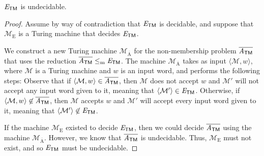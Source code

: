\begin{theorem}\label{thm:ETMundecidable}
$\mathit{E}_{\textsf{TM}}$ is undecidable.

\begin{proof}
Assume by way of contradiction that $\mathit{E}_{\textsf{TM}}$ is decidable, and suppose that $\mathcal{M}_{\mathrm{E}}$ is a Turing machine that decides $\mathit{E}_{\textsf{TM}}$.

We construct a new Turing machine $\mathcal{M}_{\overline{\mathrm{A}}}$ for the non-membership problem $\overline{\mathit{A}_{\textsf{TM}}}$ that uses the reduction $\overline{\mathit{A}_{\textsf{TM}}} \leq_{\mathrm{m}} \mathit{E}_{\textsf{TM}}$. The machine $\mathcal{M}_{\overline{\mathrm{A}}}$ takes as input $\langle \mathcal{M}, w \rangle$, where $\mathcal{M}$ is a Turing machine and $w$ is an input word, and performs the following steps:
Observe that if $\langle \mathcal{M}, w \rangle \in \overline{\mathit{A}_{\textsf{TM}}}$, then $\mathcal{M}$ does not accept $w$ and $\mathcal{M}'$ will not accept any input word given to it, meaning that $\langle \mathcal{M}' \rangle \in \mathit{E}_{\textsf{TM}}$. Otherwise, if $\langle \mathcal{M}, w \rangle \not\in \overline{\mathit{A}_{\textsf{TM}}}$, then $\mathcal{M}$ accepts $w$ and $\mathcal{M}'$ will accept every input word given to it, meaning that $\langle \mathcal{M}' \rangle \not\in \mathit{E}_{\textsf{TM}}$.

If the machine $\mathcal{M}_{\mathrm{E}}$ existed to decide $\mathit{E}_{\textsf{TM}}$, then we could decide $\overline{\mathit{A}_{\textsf{TM}}}$ using the machine $\mathcal{M}_{\overline{\mathrm{A}}}$. However, we know that $\overline{\mathit{A}_{\textsf{TM}}}$ is undecidable. Thus, $\mathcal{M}_{\mathrm{E}}$ must not exist, and so $\mathit{E}_{\textsf{TM}}$ must be undecidable.
\end{proof}
\end{theorem}


